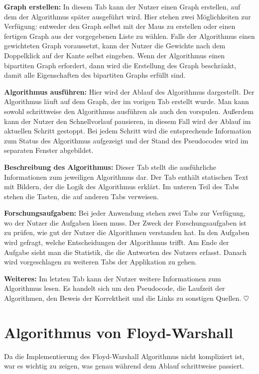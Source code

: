 \noindent\textbf{Graph erstellen:} In diesem Tab kann der Nutzer einen Graph erstellen, auf dem der Algorithmus später ausgeführt wird. Hier stehen zwei Möglichkeiten zur Verfügung: entweder den Graph selbst mit der Maus zu erstellen oder einen fertigen Graph aus der vorgegebenen Liste zu wählen. Falls der Algorithmus einen gewichteten Graph voraussetzt, kann der Nutzer die Gewichte nach dem Doppelklick auf der Kante selbst eingeben. Wenn der Algorithmus einen bipartiten Graph erfordert, dann wird die Erstellung des Graph beschränkt, damit alle Eigenschaften des bipartiten Graphs erfüllt sind. 

\noindent\textbf{Algorithmus ausführen:} Hier wird der Ablauf des Algorithmus dargestellt. Der Algorithmus läuft auf dem Graph, der im vorigen Tab erstellt wurde. Man kann sowohl schrittweise den Algorithmus ausführen als auch den vorspulen. Außerdem kann der Nutzer den Schnellvorlauf pausieren, in diesem Fall wird der Ablauf im aktuellen Schritt gestoppt. Bei jedem Schritt wird die entsprechende Information zum Status des Algorithmus aufgezeigt und der Stand des Pseudocodes wird im separaten Fenster abgebildet.

\noindent\textbf{Beschreibung des Algorithmus:} Dieser Tab stellt die ausführliche Informationen zum jeweiligen Algorithmus dar. Der Tab enthält statischen Text mit Bildern, der die Logik des Algorithmus erklärt. Im unteren Teil des Tabs stehen die Tasten, die auf anderen Tabs verweisen.

\noindent\textbf{Forschungsaufgaben:} Bei jeder Anwendung stehen zwei Tabs zur Verfügung, wo der Nutzer die Aufgaben lösen muss. Der Zweck der Forschungsaufgaben ist zu prüfen, wie gut der Nutzer die Algorithmen verstanden hat. In den Aufgaben wird gefragt, welche Entscheidungen der Algorithmus trifft. Am Ende der Aufgabe sieht man die Statistik, die die Antworten des Nutzers erfasst. Danach wird vorgeschlagen zu weiteren Tabs der Applikation zu gehen.

\noindent\textbf{Weiteres:} Im letzten Tab kann der Nutzer weitere Informationen zum Algorithmus lesen. Es handelt sich um den Pseudocode, die Laufzeit der Algorithmen, den Beweis der Korrektheit und die Links zu sonstigen Quellen. \hfill$\heartsuit$

\section{Algorithmus von Floyd-Warshall} %
Da die Implementierung des Floyd-Warshall Algorithmus nicht kompliziert ist, war es wichtig zu zeigen, was genau während dem Ablauf schrittweise passiert. 

